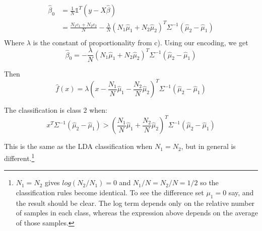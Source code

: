 \begin{align*}
    \hat{\beta}_0 &= \frac{1}{N}\mathbb{1}^T\left(y - X\hat{\beta}\right)\\
    &= \frac{N_1 c_1 + N_2 c_2}{N} - \frac{\lambda}{N} \left(N_1 \hat{\mu}_1 + N_2 \hat{\mu}_2\right)^T \Sigma^{-1} \left(\hat{\mu}_2 - \hat{\mu}_1 \right)\\
\end{align*}
Where $\lambda$ is the constant of proportionality from c).
Using our encoding, we get 
$$\hat{\beta}_0 =  - \frac{\lambda}{N} \left(N_1 \hat{\mu}_1 + N_2 \hat{\mu}_2\right)^T \Sigma^{-1} \left(\hat{\mu}_2 - \hat{\mu}_1 \right)$$

Then $$\hat{f}(x) = \lambda \left(x -\frac{N_1}{N} \hat{\mu}_1 - \frac{N_2}{N} \hat{\mu}_2\right)^T \Sigma^{-1} \left(\hat{\mu}_2 - \hat{\mu}_1 \right)$$

The classification is class $2$ when:
$$x^T \Sigma^{-1} \left(\hat{\mu}_2 - \hat{\mu}_1 \right) > \left(\frac{N_1}{N} \hat{\mu}_1 + \frac{N_2}{N} \hat{\mu}_2\right)^T \Sigma^{-1} \left(\hat{\mu}_2 - \hat{\mu}_1 \right)$$

This is the same as the LDA classification when $N_1 = N_2$, but in general is different.\footnote{
$N_1 = N_2$ gives $log (N_2 / N_1) = 0$ and $N_1 / N = N_2 / N = 1/2$ so the classification rules become identical. To see the difference set $\mu_1 = 0$ say, and the result should be clear. The log term depends only on the relative number of samples in each class, whereas the expression above depends on the average of those samples.}
